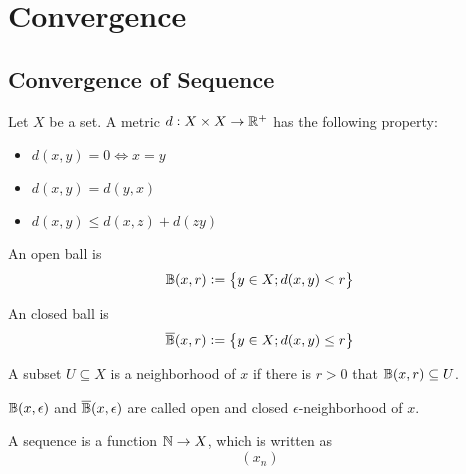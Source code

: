 \chapter{Convergence}


%
%
%
%

\section{Convergence of Sequence}


\begin{definition}[metric]
    Let $X$ be a set. A metric $d: X \times X \rightarrow \mathbb{R}^{+}$ has the following property:
    \begin{itemize}
        \item $d(x,y) = 0 \Leftrightarrow x = y$
        \item $d(x,y) = d(y,x)$
        \item $d(x,y) \leq d(x,z) + d(z y)$
    \end{itemize}
\end{definition}

\begin{definition}
    An open ball is
    \begin{equation}
        \mathbb{B}(x, r) := \set{y \in X; d(x,y) < r}
    \end{equation}
    
    An closed ball is
    \begin{equation}
        \overline{\mathbb{B}}(x, r) := \set{y \in X; d(x,y) \leq r}
    \end{equation}
\end{definition}

\begin{definition}[neighborhood]
    A subset $U \subseteq X$ is a neighborhood of $x$ if there is $r>0$ that $\mathbb{B}(x, r) \subseteq U$. 
\end{definition}

\begin{definition}
    $\mathbb{B}(x, \epsilon)$ and $\overline{\mathbb{B}}(x, \epsilon)$ are called open and closed $\epsilon$-neighborhood of $x$.
\end{definition}

\begin{definition}[sequence]
    A sequence is a function $\mathbb{N} \rightarrow X$, which is written as
    \begin{equation}
        (x_n)
    \end{equation}
\end{definition}

